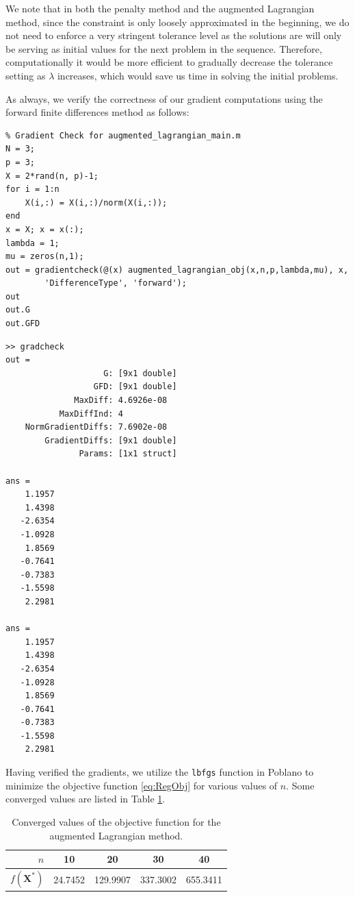 \documentclass[11pt]{article}
\begin{document}
We note that in both the penalty method and the augmented Lagrangian method, since the constraint is only loosely approximated in the beginning, we do not need to enforce a very stringent tolerance level as the solutions are will only be serving as initial values for the next problem in the sequence. Therefore, computationally it would be more efficient to gradually decrease the tolerance setting as $\lambda$ increases, which would save us time in solving the initial problems.

As always, we verify the correctness of our gradient computations using the forward finite differences method as follows:
\begin{lstlisting}
% Gradient Check for augmented_lagrangian_main.m
N = 3;
p = 3;
X = 2*rand(n, p)-1;
for i = 1:n
    X(i,:) = X(i,:)/norm(X(i,:));
end
x = X; x = x(:);
lambda = 1;
mu = zeros(n,1);
out = gradientcheck(@(x) augmented_lagrangian_obj(x,n,p,lambda,mu), x,
		'DifferenceType', 'forward');
out
out.G
out.GFD
\end{lstlisting}

\begin{verbatim}
>> gradcheck
out = 
                    G: [9x1 double]
                  GFD: [9x1 double]
              MaxDiff: 4.6926e-08
           MaxDiffInd: 4
    NormGradientDiffs: 7.6902e-08
        GradientDiffs: [9x1 double]
               Params: [1x1 struct]

ans =
    1.1957
    1.4398
   -2.6354
   -1.0928
    1.8569
   -0.7641
   -0.7383
   -1.5598
    2.2981

ans =
    1.1957
    1.4398
   -2.6354
   -1.0928
    1.8569
   -0.7641
   -0.7383
   -1.5598
    2.2981
\end{verbatim}

\noindent Having verified the gradients, we utilize the \texttt{lbfgs} function in Poblano to minimize the objective function \eqref{eq:RegObj} for various values of $n$. Some converged values are listed in Table \ref{tb:ObjAugLag}.

\begin{table}[!htb]
  \centering
  \begin{tabular}{rcccc}
	\toprule
	$n$ & 10 & 20 & 30 & 40 \\
	\midrule
	$f(\bm{X}^*)$ & 24.7452 & 129.9907 & 337.3002 & 655.3411 \\
	\bottomrule
  \end{tabular}
  \caption{Converged values of the objective function for the augmented Lagrangian method.}\label{tb:ObjAugLag}
\end{table}
\end{document}
